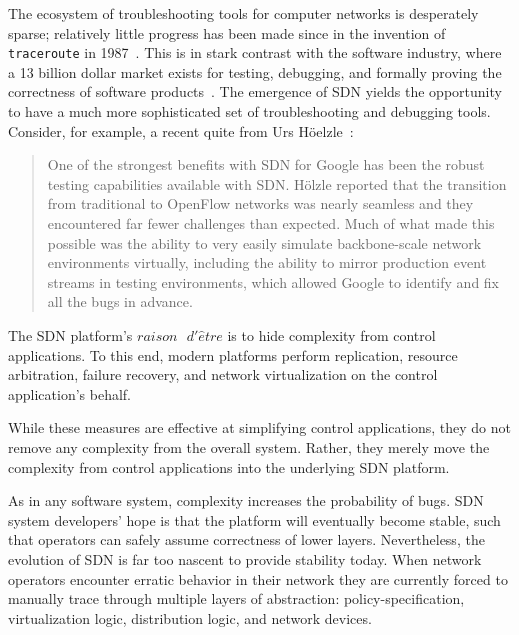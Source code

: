 The ecosystem of troubleshooting tools for computer networks is desperately
sparse; relatively little progress has been made since in the invention of
{\tt traceroute} in 1987~\cite{traceroute}. This is in stark contrast with the software 
industry, where a 13 billion dollar market
exists for testing, debugging, and formally proving the correctness of
software products~\cite{testing_market}. The emergence of SDN yields the
opportunity to have a much more sophisticated set of troubleshooting and
debugging tools. Consider, for example, a recent quite from Urs
H\"oelzle~\cite{urs}:

\begin{quote}
One of the strongest benefits with SDN for Google has been the robust
testing capabilities available with SDN. H\"olzle reported that the
transition from traditional to OpenFlow networks was nearly seamless and
they encountered far fewer challenges than expected. Much of what made
this possible was the ability to very easily simulate backbone-scale
network environments virtually, including the ability to mirror
production event streams in testing environments, which allowed Google
to identify and fix all the bugs in advance.
\end{quote}

The SDN platform's $raison\text{ }d'\hat{e}tre$ is to 
hide complexity from control applications. To this end, modern platforms perform
replication, resource arbitration, failure recovery, and network 
virtualization on the control application's behalf. 

While these measures are effective at simplifying control applications,
they do not remove any complexity from the overall system. Rather,
they merely move the complexity
from control applications into the underlying SDN platform. 

As in any software system, complexity increases the probability of
bugs. SDN system developers' hope is that the platform will eventually become
stable, such that operators can safely assume correctness of lower layers.
Nevertheless, the evolution of SDN is far too nascent to provide stability
today. When network operators encounter erratic behavior in their network
they are currently forced to manually trace through
multiple layers of abstraction: policy-specification, virtualization logic,
distribution logic, and network devices. 


